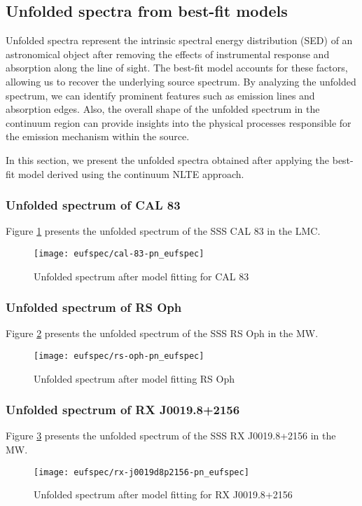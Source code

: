 		\newpage
		\subsection{Unfolded spectra from best-fit models}
			Unfolded spectra represent the intrinsic spectral energy distribution (SED) of an astronomical object after removing the effects of instrumental response and absorption along the line of sight. The best-fit model accounts for these factors, allowing us to recover the underlying source spectrum. By analyzing the unfolded spectrum, we can identify prominent features such as emission lines and absorption edges. Also, the overall shape of the unfolded spectrum in the continuum region can provide insights into the physical processes responsible for the emission mechanism within the source.
			
			In this section, we present the unfolded spectra obtained after applying the best-fit model derived using the continuum NLTE approach.
		
			\subsubsection*{Unfolded spectrum of CAL 83}
				Figure \ref{result:euf-cal-83} presents the unfolded spectrum of the SSS CAL 83 in the LMC.
				\begin{figure}[h!]
					\centering
					\texttt{[image: eufspec/cal-83-pn\_eufspec]}
					\caption{Unfolded spectrum after model fitting for CAL 83}
					\label{result:euf-cal-83}
				\end{figure}
			
			\newpage
			\subsubsection*{Unfolded spectrum of RS Oph}
				Figure \ref{result:euf-rs-oph} presents the unfolded spectrum of the SSS RS Oph in the MW.
				\begin{figure}[h!]
					\centering
					\texttt{[image: eufspec/rs-oph-pn\_eufspec]}
					\caption{Unfolded spectrum after model fitting RS Oph}
					\label{result:euf-rs-oph}
				\end{figure}
			
			\subsubsection*{Unfolded spectrum of RX J0019.8+2156}
				Figure \ref{result:euf-rx-j0019} presents the unfolded spectrum of the SSS RX J0019.8+2156 in the MW.
				\begin{figure}[h!]
					\centering
					\texttt{[image: eufspec/rx-j0019d8p2156-pn\_eufspec]}
					\caption{Unfolded spectrum after model fitting for RX J0019.8+2156}
					\label{result:euf-rx-j0019}
				\end{figure}
			
